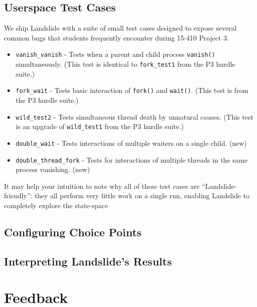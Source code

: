 \documentclass{article}
\begin{document}
\subsection{Userspace Test Cases}
\label{sec:testcase}

We ship Landslide with a suite of small test cases designed to expose several common bugs that students frequently encounter during 15-410 Project 3.

\begin{itemize}
	\item \texttt{vanish\_vanish} - Tests when a parent and child process \texttt{vanish()} simultaneously. (This test is identical to \texttt{fork\_test1} from the P3 hurdle suite.)
	\item \texttt{fork\_wait} - Tests basic interaction of \texttt{fork()} and \texttt{wait()}. (This test is from the P3 hurdle suite.)
	\item \texttt{wild\_test2} - Tests simultaneous thread death by unnatural causes. (This test is an upgrade of \texttt{wild\_test1} from the P3 hurdle suite.)
	\item \texttt{double\_wait} - Tests interactions of multiple waiters on a single child. (new)
	\item \texttt{double\_thread\_fork} - Tests for interactions of multiple threads in the same process vanishing. (new)
\end{itemize}

It may help your intuition to note why all of these test cases are ``Landslide-friendly'': they all perform very little work on a single run, enabling Landslide to completely explore the state-space 

\subsection{Configuring Choice Points}
\label{sec:choice}

\subsection{Interpreting Landslide's Results}

\section{Feedback}
\end{document}
